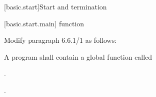 \setcounter{section}{5}
[basic.start]{Start and termination}

\setcounter{subsection}{0}
[basic.start.main]{ function}

Modify paragraph 6.6.1/1 as follows:
\begin{std.txt}
  \resetalinea[0]
  \alinea
  A program shall contain a global function called 
  \begin{before}
  .
  \end{before}
  \begin{after}
  .
  \end{after}
\end{std.txt}

